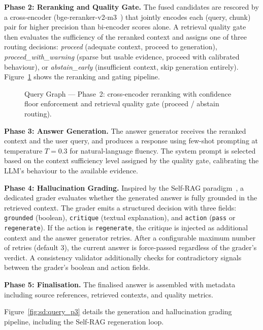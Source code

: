 \textbf{Phase 2: Reranking and Quality Gate.} The fused candidates are rescored by a cross-encoder (bge-reranker-v2-m3~\cite{xiao2023cpack}) that jointly encodes each (query, chunk) pair for higher precision than bi-encoder scores alone. A retrieval quality gate then evaluates the sufficiency of the reranked context and assigns one of three routing decisions: \emph{proceed} (adequate context, proceed to generation), \emph{proceed\_with\_warning} (sparse but usable evidence, proceed with calibrated behaviour), or \emph{abstain\_early} (insufficient context, skip generation entirely). Figure~\ref{fig:sd:query_p2} shows the reranking and gating pipeline.

\begin{figure}[htbp]
\centering
{}
\caption{Query Graph --- Phase~2: cross-encoder reranking with confidence floor enforcement and retrieval quality gate (proceed / abstain routing).}
\label{fig:sd:query_p2}
\end{figure}

\textbf{Phase 3: Answer Generation.} The answer generator receives the reranked context and the user query, and produces a response using few-shot prompting at temperature $T=0.3$ for natural-language fluency. The system prompt is selected based on the context sufficiency level assigned by the quality gate, calibrating the LLM's behaviour to the available evidence.

\textbf{Phase 4: Hallucination Grading.} Inspired by the Self-RAG paradigm~\cite{asai2023selfraglearningretrievegenerate}, a dedicated grader evaluates whether the generated answer is fully grounded in the retrieved context. The grader emits a structured decision with three fields: \texttt{grounded} (boolean), \texttt{critique} (textual explanation), and \texttt{action} (\texttt{pass} or \texttt{regenerate}). If the action is \texttt{regenerate}, the critique is injected as additional context and the answer generator retries. After a configurable maximum number of retries (default 3), the current answer is force-passed regardless of the grader's verdict. A consistency validator additionally checks for contradictory signals between the grader's boolean and action fields.

\textbf{Phase 5: Finalisation.} The finalised answer is assembled with metadata including source references, retrieved contexts, and quality metrics.

Figure~\ref{fig:sd:query_p3} details the generation and hallucination grading pipeline, including the Self-RAG regeneration loop.

